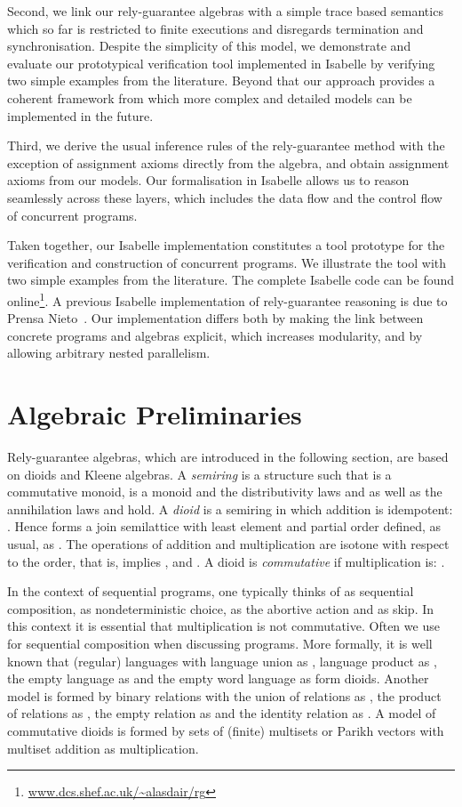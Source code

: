 \documentclass{llncs}
\begin{document}
Second, we link our rely-guarantee algebras with a simple trace based
semantics which so far is restricted to finite executions and
disregards termination and synchronisation. Despite the simplicity of
this model, we demonstrate and evaluate our prototypical verification
tool implemented in Isabelle by verifying two simple examples from
the literature. Beyond that our approach provides a coherent framework
from which more complex and detailed models can be implemented in the
future.

Third, we derive the usual inference rules of the rely-guarantee
method with the exception of assignment axioms directly from the
algebra, and obtain assignment axioms from our models. Our
formalisation in Isabelle allows us to reason seamlessly across these
layers, which includes the data flow and the control flow of concurrent
programs.

Taken together, our Isabelle implementation constitutes a tool
prototype for the verification and construction of concurrent
programs. We illustrate the tool with two simple examples from the
literature. The complete Isabelle code can be found
online\footnote{\url{www.dcs.shef.ac.uk/~alasdair/rg}}. A
previous Isabelle implementation of rely-guarantee reasoning is due to
Prensa Nieto~\cite{nieto_rely-guarantee_2003}. Our implementation
differs both by making the link between concrete programs and algebras
explicit, which increases modularity, and by allowing arbitrary nested parallelism.

\section{Algebraic Preliminaries}
\label{sec:KA}

Rely-guarantee algebras, which are introduced in the following
section, are based on dioids and Kleene algebras. A \emph{semiring} is
a structure  such that  is a commutative
monoid,  is a monoid and the distributivity laws  and  as
well as the annihilation laws  and  hold. A
\emph{dioid} is a semiring in which addition is idempotent:
. Hence  forms a join semilattice with least element
 and partial order defined, as usual, as . The operations of addition and multiplication are isotone with
respect to the order, that is,  implies ,
 and . A dioid is
\emph{commutative} if multiplication is: .

In the context of sequential programs, one typically thinks of 
as sequential composition,  as nondeterministic choice,  as the
abortive action and  as skip. In this context it is essential that
multiplication is not commutative. Often we use  for sequential
composition when discussing programs. More formally, it is well known
that (regular) languages with language union as , language
product as , the empty language as  and the empty word
language  as  form dioids. Another model is formed
by binary relations with the union of relations as , the product of
relations as , the empty relation as  and the identity
relation as . A model of commutative dioids is formed by sets of
(finite) multisets or Parikh vectors with multiset addition as
multiplication.
\end{document}
